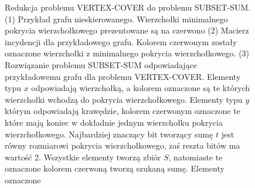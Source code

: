 \begin{figure}[tbh]
\caption{Redukcja problemu VERTEX-COVER do problemu SUBSET-SUM.
	\newline (1) Przykład grafu nieskierowanego. Wierzchołki minimalnego pokrycia wierzchołkowego prezentowane są na czerwono
	\newline (2) Macierz incydencji dla przykładowego grafu. Kolorem czerwonym zostały oznaczone wierzchołki z minimalnego pokrycia wierzchołkowego.
	\newline (3) Rozwiązanie problemu SUBSET-SUM odpowiadające przykładowemu grafu dla problemu VERTEX-COVER. Elementy typu $x$ odpowiadają wierzchołką, a kolorem oznaczone są te których wierzchołki wchodzą do pokrycia wierzchołkowego. Elementy typu $y$ którym odpowiadają krawędzie, kolorem czerwonym oznaczone te które mają koniec w dokładnie jednym wierzchołku pokrycia wierzchołkowego. Najbardziej znaczący bit tworzący sumę $t$ jest równy rozmiarowi pokrycia wierzchołkowego, zaś reszta bitów ma wartość 2. Wszystkie elementy tworzą zbiór $S$, natomiaste te oznaczone kolorem czerwoną tworzą szukaną sumę.
	 Elementy oznaczone
	}
\label{subset_sum-proof-example}
\end{figure}
